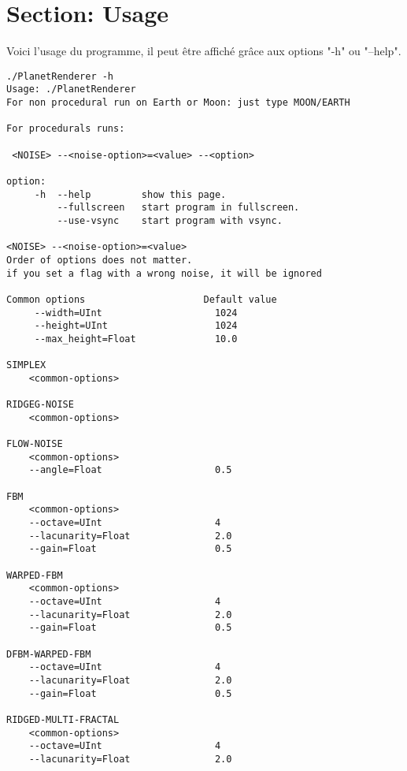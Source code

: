 \section*{Section: Usage}
\label{annexe:usage}

Voici l'usage du programme, il peut être affiché grâce aux options "-h" ou "--help".

\begin{center}
\lstset{language=sh}
\begin{lstlisting}[basicstyle=\small]
./PlanetRenderer -h     
Usage: ./PlanetRenderer
For non procedural run on Earth or Moon: just type MOON/EARTH 

For procedurals runs:

 <NOISE> --<noise-option>=<value> --<option>

option:
	 -h  --help      	show this page.
	     --fullscreen	start program in fullscreen.
	     --use-vsync	start program with vsync.

<NOISE> --<noise-option>=<value>
Order of options does not matter.
if you set a flag with a wrong noise, it will be ignored

Common options                     Default value
	 --width=UInt                    1024
	 --height=UInt                   1024
	 --max_height=Float              10.0

SIMPLEX
	<common-options>

RIDGEG-NOISE
	<common-options>

FLOW-NOISE
	<common-options>
	--angle=Float                    0.5

FBM
	<common-options> 
	--octave=UInt                    4
	--lacunarity=Float               2.0 
	--gain=Float                     0.5

WARPED-FBM 
	<common-options> 
	--octave=UInt                    4
	--lacunarity=Float               2.0
	--gain=Float                     0.5

DFBM-WARPED-FBM 
	--octave=UInt                    4
	--lacunarity=Float               2.0
	--gain=Float                     0.5

RIDGED-MULTI-FRACTAL 
	<common-options> 
	--octave=UInt                    4
	--lacunarity=Float               2.0


\end{lstlisting}
\end{center}
